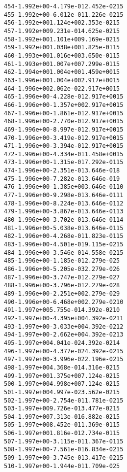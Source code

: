 \begin{alltt}
 454  -1.992e+00  -4.179e-01   2.452e-02   15
 455  -1.992e+00  -6.012e-01   1.226e-02   15
 456  -1.992e+00   1.124e+00   2.353e-02   15
 457  -1.992e+00   9.231e-01   4.625e-02   15
 458  -1.992e+00   1.101e+00   9.169e-02   15
 459  -1.992e+00   1.038e+00   1.825e-01   15
 460  -1.993e+00   1.016e+00   3.650e-01   15
 461  -1.993e+00   1.007e+00   7.299e-01   15
 462  -1.994e+00   1.004e+00   1.459e+00   15
 463  -1.996e+00   1.004e+00   2.917e+00   15
 464  -1.996e+00   2.062e-02   2.917e+00   15
 465  -1.996e+00  -4.228e-01   2.917e+00   15
 466  -1.996e+00  -1.357e+00   2.917e+00   15
 467  -1.996e+00  -1.861e-01   2.917e+00   15
 468  -1.996e+00  -2.770e-01   2.917e+00   15
 469  -1.996e+00  -8.997e-01   2.917e+00   15
 470  -1.996e+00  -3.419e-01   2.917e+00   15
 471  -1.996e+00  -3.394e-01   2.917e+00   15
 472  -1.996e+00  -4.334e-01   1.458e+00   15
 473  -1.996e+00  -1.315e-01   7.292e-01   15
 474  -1.996e+00  -2.351e-01   3.646e-01    8
 475  -1.996e+00  -7.282e-01   3.646e-01    9
 476  -1.996e+00  -1.385e+00   3.646e-01   10
 477  -1.996e+00  -9.298e-01   3.646e-01   11
 478  -1.996e+00  -8.224e-01   3.646e-01   12
 479  -1.996e+00  -3.867e-01   3.646e-01   13
 480  -1.996e+00  -3.702e-01   3.646e-01   14
 481  -1.996e+00  -5.038e-01   3.646e-01   15
 482  -1.996e+00  -4.268e-01   1.823e-01   15
 483  -1.996e+00  -4.501e-01   9.115e-02   15
 484  -1.996e+00  -3.546e-01   4.558e-02   15
 485  -1.996e+00  -1.185e-01   2.279e-02    5
 486  -1.996e+00  -5.205e-03   2.279e-02    6
 487  -1.996e+00  -3.747e-01   2.279e-02    7
 488  -1.996e+00  -3.796e-01   2.279e-02    8
 489  -1.996e+00  -2.251e+00   2.279e-02    9
 490  -1.996e+00  -6.468e+00   2.279e-02   10
 491  -1.997e+00   5.755e-01   4.392e-02   10
 492  -1.997e+00  -4.395e+00   4.392e-02   11
 493  -1.997e+00  -3.033e+00   4.392e-02   12
 494  -1.997e+00  -2.662e+00   4.392e-02   13
 495  -1.997e+00   4.041e-02   4.392e-02   14
 496  -1.997e+00  -4.377e-02   4.392e-02   15
 497  -1.997e+00  -3.996e-02   2.196e-02   15
 498  -1.997e+00   4.368e-01   4.316e-02   15
 499  -1.997e+00   1.375e+00   7.124e-02   15
 500  -1.997e+00   4.998e+00   7.124e-02   15
 501  -1.997e+00   4.997e-02   3.562e-02   15
 502  -1.997e+00  -2.754e-01   1.781e-02   15
 503  -1.997e+00   9.726e-01   3.477e-02   15
 504  -1.997e+00   7.313e-01   6.882e-02   15
 505  -1.997e+00   8.452e-01   1.369e-01   15
 506  -1.997e+00   1.816e-01   2.734e-01   15
 507  -1.997e+00  -3.115e-01   1.367e-01   15
 508  -1.997e+00  -7.561e-01   6.834e-02   15
 509  -1.997e+00  -3.745e-01   3.417e-02   15
 510  -1.997e+00  -1.944e-01   1.709e-02    5

\end{alltt}
